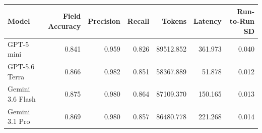 \begin{tabular}{lrrrrrr}
\toprule
Model & Field Accuracy & Precision & Recall & Tokens & Latency & Run-to-Run SD \\
\midrule
GPT-5 mini & 0.841 & 0.959 & 0.826 & 89512.852 & 361.973 & 0.040 \\
GPT-5.6 Terra & 0.866 & 0.982 & 0.851 & 58367.889 & 51.878 & 0.012 \\
Gemini 3.6 Flash & 0.875 & 0.980 & 0.864 & 87109.370 & 150.165 & 0.013 \\
Gemini 3.1 Pro & 0.869 & 0.980 & 0.857 & 86480.778 & 221.268 & 0.014 \\
\bottomrule
\end{tabular}
